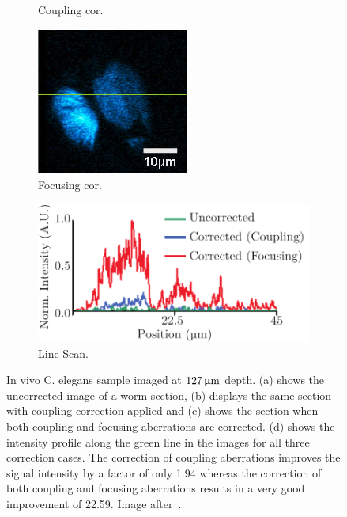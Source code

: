 \begin{figure}[tbh]
\begin{subfigure}[b]{0.20\textwidth}
							\caption{Coupling cor.}
							\label{fig:elegance_coupling}
			\end{subfigure}		
			\begin{subfigure}[b]{0.20\textwidth}
							\includegraphics[width=\textwidth]{images/elegance_all_corr}
							\caption{Focusing cor.}
							\label{fig:elegance_all_corr}
			\end{subfigure}
			\begin{subfigure}[b]{0.37\textwidth}
							\includegraphics[width=\textwidth]{images/elegance_result}
							\caption{Line Scan.}
							\label{fig:elegance_result}
			\end{subfigure}							
			\caption{In vivo C. elegans sample imaged at $\unit[127]{\upmu m}$ depth. (a) shows the uncorrected image of a worm section, (b) displays the same section with coupling correction applied and (c) shows the section when both coupling and focusing aberrations are corrected. (d) shows the intensity profile along the green line in the images for all three correction cases. The correction of coupling aberrations improves the signal intensity by a factor of only 1.94 whereas the correction of both coupling and focusing aberrations results in a very good improvement of 22.59. Image after~\cite{scan_TPFM_guide_start}.}
	\label{fig:elegance}
\end{figure} 

